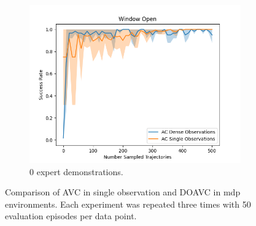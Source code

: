 \begin{figure}[htbp]
\begin{subfigure}[t]{0.32\textwidth}
    \includegraphics[width=\textwidth]{images/dense_vs_sparse_0/Window Open.png}
    \caption{0 expert demonstrations.}
  \end{subfigure}
  \caption{Comparison of AVC in single observation and DOAVC in mdp environments. Each experiment was repeated three times with 50 evaluation episodes per data point.
  }
  \label{fig:dense_vs_single}
\end{figure}
